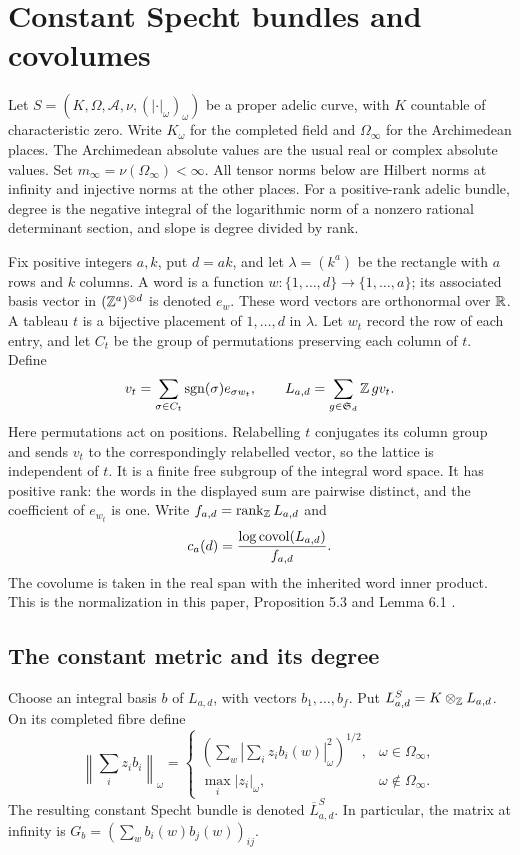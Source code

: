 \chapter{Constant Specht bundles and covolumes}

Let $S=(K,\Omega,\mathcal A,\nu,(|\cdot|_\omega)_\omega)$ be a proper
adelic curve, with $K$ countable of characteristic zero. Write $K_\omega$
for the completed field and $\Omega_\infty$ for the Archimedean places.
The Archimedean absolute values are the usual real or complex absolute
values. Set $m_\infty=\nu(\Omega_\infty)<\infty$.
All tensor norms below are Hilbert norms at infinity and injective norms
at the other places. For a positive-rank adelic bundle, degree is the
negative integral of the logarithmic norm of a nonzero rational determinant
section, and slope is degree divided by rank.

Fix positive integers $a,k$, put $d=ak$, and let $\lambda=(k^a)$ be the
rectangle with $a$ rows and $k$ columns. A word is a function
$w:\{1,\ldots,d\}\to\{1,\ldots,a\}$; its associated basis vector in
$(\mathbb Z^a)^{\otimes d}$ is denoted $e_w$. These word vectors are orthonormal
over $\mathbb R$. A tableau $t$ is a bijective placement of $1,\ldots,d$ in
$\lambda$. Let $w_t$ record the row of each entry, and let $C_t$ be the
group of permutations preserving each column of $t$. Define
\[
 v_t=\sum_{\sigma\in C_t}\operatorname{sgn}(\sigma)e_{\sigma w_t},
 \qquad L_{a,d}=\sum_{g\in\mathfrak S_d}\mathbb Z\,gv_t.
\]
Here permutations act on positions. Relabelling $t$ conjugates its column
group and sends $v_t$ to the correspondingly relabelled vector, so the
lattice is independent of $t$. It is a finite free subgroup of the integral
word space. It has positive rank: the words in the displayed sum are
pairwise distinct, and the coefficient of $e_{w_t}$ is one. Write
$f_{a,d}=\operatorname{rank}_{\mathbb Z}L_{a,d}$ and
\[
 c_a(d)=\frac{\log\operatorname{covol}(L_{a,d})}{f_{a,d}}.
\]
The covolume is taken in the real span with the inherited word inner
product. This is the normalization in this paper, Proposition 5.3 and
Lemma 6.1 \cite{bost2026}.

\section{The constant metric and its degree}

\begin{definition}
\label{def:constant-specht}
\leanok
Choose an integral basis $b$ of $L_{a,d}$, with vectors $b_1,\ldots,b_f$.
Put $L^S_{a,d}=K\otimes_\mathbb Z L_{a,d}$. On its completed fibre define
\[
 \left\|\sum_i z_i b_i\right\|_\omega=
 \begin{cases}
 \displaystyle\left(\sum_w\left|\sum_i z_i b_i(w)\right|_\omega^2\right)^{1/2},
       &\omega\in\Omega_\infty,\\[3pt]
 \displaystyle\max_i|z_i|_\omega,&\omega\notin\Omega_\infty.
 \end{cases}
\]
The resulting constant Specht bundle is denoted $\overline L^S_{a,d}$.
In particular, the matrix at infinity is
$G_b=(\sum_w b_i(w)b_j(w))_{ij}$.
\end{definition}


